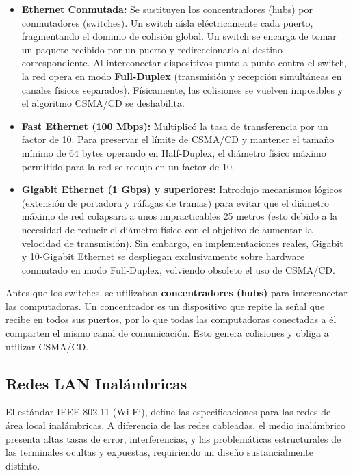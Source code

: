 \begin{itemize}
    \item \textbf{Ethernet Conmutada:} Se sustituyen los concentradores (hubs) por conmutadores (switches). Un switch aísla eléctricamente cada puerto, fragmentando el dominio de colisión global. Un switch se encarga de tomar un paquete recibido por un puerto y redireccionarlo al destino correspondiente. Al interconectar dispositivos punto a punto contra el switch, la red opera en modo \textbf{Full-Duplex} (transmisión y recepción simultáneas en canales físicos separados). Físicamente, las colisiones se vuelven imposibles y el algoritmo CSMA/CD se deshabilita.
    
    \item \textbf{Fast Ethernet (100 Mbps):} Multiplicó la tasa de transferencia por un factor de 10. Para preservar el límite de CSMA/CD y mantener el tamaño mínimo de 64 bytes operando en Half-Duplex, el diámetro físico máximo permitido para la red se redujo en un factor de 10.
    
    \item \textbf{Gigabit Ethernet (1 Gbps) y superiores:} Introdujo mecanismos lógicos (extensión de portadora y ráfagas de tramas) para evitar que el diámetro máximo de red colapsara a unos impracticables 25 metros (esto debido a la necesidad de reducir el diámetro físico con el objetivo de aumentar la velocidad de transmisión). Sin embargo, en implementaciones reales, Gigabit y 10-Gigabit Ethernet se despliegan exclusivamente sobre hardware conmutado en modo Full-Duplex, volviendo obsoleto el uso de CSMA/CD.
\end{itemize}

\begin{obs}
  Antes que los switches, se utilizaban \textbf{concentradores (hubs)} para interconectar las computadoras. Un concentrador es un dispositivo que repite la señal que recibe en todos sus puertos, por lo que todas las computadoras conectadas a él comparten el mismo canal de comunicación. Esto genera colisiones y obliga a utilizar CSMA/CD.
\end{obs}

\subsection{Redes LAN Inalámbricas}

El estándar IEEE 802.11 (Wi-Fi), define las especificaciones para las redes de área local inalámbricas. A diferencia de las redes cableadas, el medio inalámbrico presenta altas tasas de error, interferencias, y las problemáticas estructurales de las terminales ocultas y expuestas, requiriendo un diseño  sustancialmente distinto.

